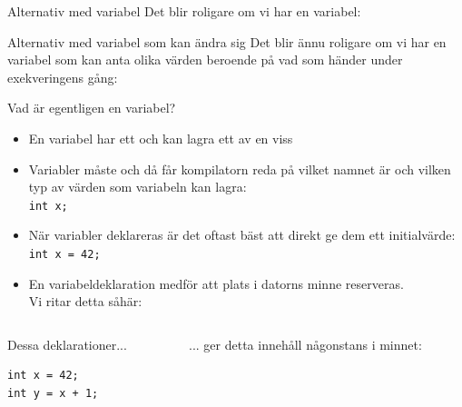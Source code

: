\documentclass{lecturenotes}
\begin{document}
\begin{Slide}{Alternativ med variabel}
\footnotesize
Det blir roligare om vi har en variabel:

\end{Slide}

\begin{Slide}{Alternativ med variabel som kan ändra sig}
\footnotesize
Det blir ännu roligare om vi har en variabel som kan anta olika värden beroende på vad som händer under exekveringens gång:

\end{Slide}


\begin{Slide}{Vad är egentligen en variabel?}\scriptsize
\begin{itemize}
\item En variabel har ett  och kan lagra ett  av en viss 
\item Variabler måste   och då får kompilatorn reda på vilket namnet är och vilken typ av värden som variabeln kan lagra: \\ \lstinline{int x; }
\item När variabler deklareras är det oftast bäst att direkt ge dem ett initialvärde:  \\ \lstinline{int x = 42; }
\item En variabeldeklaration medför att plats i datorns minne reserveras. \\Vi ritar detta såhär: \\ 
\end{itemize}

\begin{columns}
\begin{column}{0.3\textwidth}
Dessa deklarationer...
\begin{lstlisting}
int x = 42;    
int y = x + 1;   
\end{lstlisting}
\end{column}
\begin{column}{0.5\textwidth}
... ger detta innehåll någonstans i minnet:

\end{column}
\end{columns}
\end{Slide}
\end{document}
